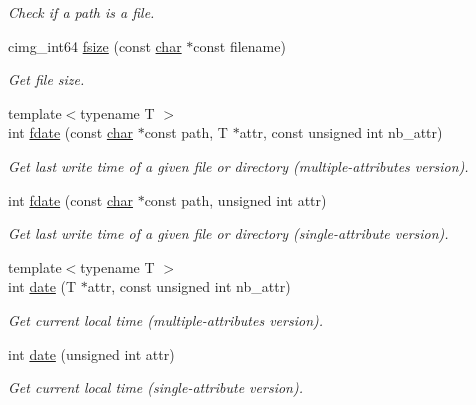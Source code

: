 \begin{DoxyCompactItemize}
\begin{DoxyCompactList}\small\item\em Check if a path is a file. \end{DoxyCompactList}\item 
cimg\+\_\+int64 \hyperlink{namespacecimg__library__suffixed_1_1cimg_a63af61d735eb705dfeae46df8bf03184}{fsize} (const \hyperlink{classchar}{char} $\ast$const filename)
\begin{DoxyCompactList}\small\item\em Get file size. \end{DoxyCompactList}\item 
{\footnotesize template$<$typename T $>$ }\\int \hyperlink{namespacecimg__library__suffixed_1_1cimg_a0654bf4ceae1444ae9fa1113cbb064ee}{fdate} (const \hyperlink{classchar}{char} $\ast$const path, T $\ast$attr, const unsigned int nb\+\_\+attr)
\begin{DoxyCompactList}\small\item\em Get last write time of a given file or directory (multiple-\/attributes version). \end{DoxyCompactList}\item 
int \hyperlink{namespacecimg__library__suffixed_1_1cimg_a1db87aed0dbd0fd7a0e709894e9f645d}{fdate} (const \hyperlink{classchar}{char} $\ast$const path, unsigned int attr)
\begin{DoxyCompactList}\small\item\em Get last write time of a given file or directory (single-\/attribute version). \end{DoxyCompactList}\item 
{\footnotesize template$<$typename T $>$ }\\int \hyperlink{namespacecimg__library__suffixed_1_1cimg_a6b6e28a991c9e426d8cb1c6d1e02849e}{date} (T $\ast$attr, const unsigned int nb\+\_\+attr)
\begin{DoxyCompactList}\small\item\em Get current local time (multiple-\/attributes version). \end{DoxyCompactList}\item 
int \hyperlink{namespacecimg__library__suffixed_1_1cimg_aac739bf544269324a04504ebe92b93e9}{date} (unsigned int attr)
\begin{DoxyCompactList}\small\item\em Get current local time (single-\/attribute version). \end{DoxyCompactList}\item 

\end{DoxyCompactItemize}
